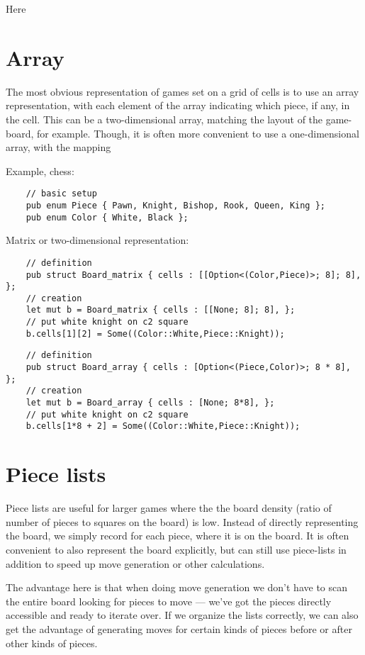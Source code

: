 \documentclass[10pt,dvipdfmx]{report}
\begin{document}
Here 

\section{Array}

The most obvious representation of games set on a grid of cells is to use an array
representation, with each element of the array indicating which piece, if any, in the cell.
This can be a two-dimensional array, matching the layout of the game-board, for example.
Though, it is often more convenient to use a one-dimensional array, with the mapping

Example, chess:
{\scriptsize\begin{verbatim}
    // basic setup
    pub enum Piece { Pawn, Knight, Bishop, Rook, Queen, King };
    pub enum Color { White, Black };
\end{verbatim}}
Matrix or two-dimensional representation:
{\scriptsize\begin{verbatim}
    // definition
    pub struct Board_matrix { cells : [[Option<(Color,Piece)>; 8]; 8], };
    // creation
    let mut b = Board_matrix { cells : [[None; 8]; 8], };
    // put white knight on c2 square
    b.cells[1][2] = Some((Color::White,Piece::Knight));
\end{verbatim}}
{\scriptsize\begin{verbatim}
    // definition
    pub struct Board_array { cells : [Option<(Piece,Color)>; 8 * 8], };
    // creation
    let mut b = Board_array { cells : [None; 8*8], };
    // put white knight on c2 square
    b.cells[1*8 + 2] = Some((Color::White,Piece::Knight));
\end{verbatim}}

\section{Piece lists}

Piece lists are useful for larger games where the the board density
(ratio of number of pieces to squares on the board) is low.  Instead of
directly representing the board, we simply record for each piece, where
it is on the board.  It is often convenient to also represent the board
explicitly, but can still use piece-lists in addition to speed up move generation
or other calculations.

The advantage here is that when doing move generation we don't have to scan the entire board
looking for pieces to move --- we've got the pieces directly accessible and ready to iterate over.
If we organize the lists correctly, we can also get the advantage of generating moves for certain
kinds of pieces before or after other kinds of pieces.
\end{document}
